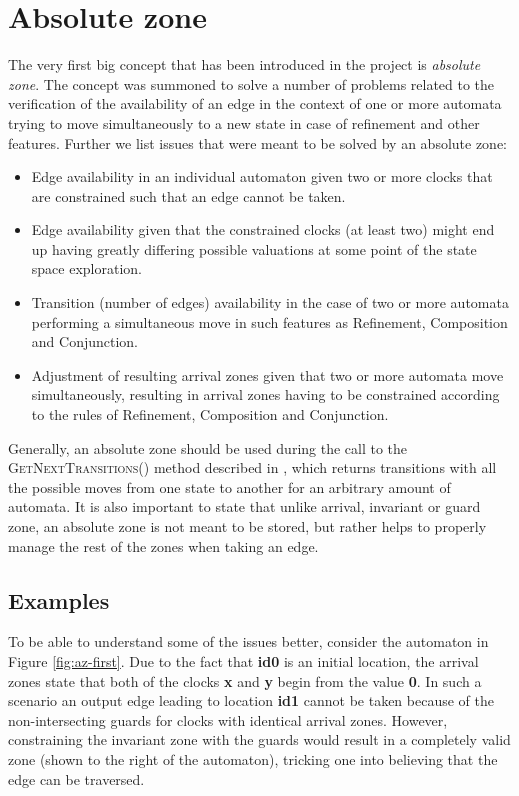 \section{Absolute zone}
The very first big concept that has been introduced in the project is \textit{absolute zone}. The concept was summoned to solve a number of problems related to the verification of the availability of an edge in the context of one or more automata trying to move simultaneously to a new state in case of refinement and other features. Further we list issues that were meant to be solved by an absolute zone:
\begin{itemize}
    \item Edge availability in an individual automaton given two or more clocks that are constrained such that an edge cannot be taken.
    \item Edge availability given that the constrained clocks (at least two) might end up having greatly differing possible valuations at some point of the state space exploration. 
    \item Transition (number of edges) availability in the case of two or more automata performing a simultaneous move in such features as Refinement, Composition and Conjunction.
    \item Adjustment of resulting arrival zones given that two or more automata move simultaneously, resulting in arrival zones having to be constrained according to the rules of Refinement, Composition and Conjunction.
\end{itemize}

Generally, an absolute zone should be used during the call to the \textsc{GetNextTransitions()} method described in \textcite{Jecdar:2019}, which returns transitions with all the possible moves from one state to another for an arbitrary amount of automata. It is also important to state that unlike arrival, invariant or guard zone, an absolute zone is not meant to be stored, but rather helps to properly manage the rest of the zones when taking an edge.

\subsection{Examples}
To be able to understand some of the issues better, consider the automaton in Figure \ref{fig:az-first}. Due to the fact that \textbf{id0} is an initial location, the arrival zones state that both of the clocks \textbf{x} and \textbf{y} begin from the value \textbf{0}. In such a scenario an output edge leading to location \textbf{id1} cannot be taken because of the non-intersecting guards for clocks with identical arrival zones. However, constraining the invariant zone with the guards would result in a completely valid zone (shown to the right of the automaton), tricking one into believing that the edge can be traversed.

